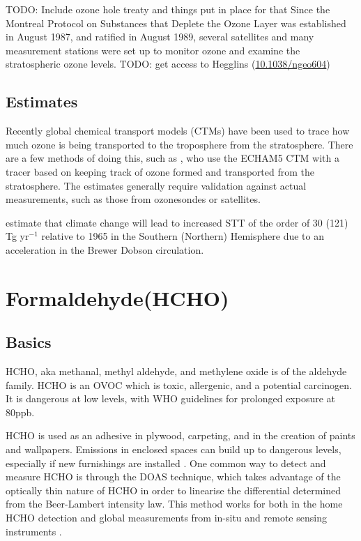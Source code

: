     TODO: Include ozone hole treaty and things put in place for that
    Since the Montreal Protocol on Substances that Deplete the Ozone Layer was established in August 1987, and ratified in August 1989, several satellites and many measurement stations were set up to monitor ozone and examine the stratospheric ozone levels.
    TODO: get access to Hegglins (\url{10.1038/ngeo604})
  \subsection{Estimates}
    
    Recently global chemical transport models (CTMs) have been used to trace how much ozone is being transported to the troposphere from the stratosphere.
    There are a few methods of doing this, such as \citet{Ojha2016}, who use the ECHAM5 CTM with a tracer based on keeping track of ozone formed and transported from the stratosphere.
    The estimates generally require validation against actual measurements, such as those from ozonesondes or satellites.
    
  \citet{Hegglin2009} estimate that climate change will lead to increased STT of the order of 30 (121) Tg yr$^{-1}$ relative to 1965 in the Southern (Northern) Hemisphere due to an acceleration in the Brewer Dobson circulation.
\section{Formaldehyde(HCHO)}
\label{ch_LitRev:sec:HCHO}
  
  \subsection{Basics}
    HCHO, aka methanal, methyl aldehyde, and methylene oxide is of the aldehyde family.
    HCHO is an OVOC which is toxic, allergenic, and a potential carcinogen. 
    It is dangerous at low levels, with WHO guidelines for prolonged exposure at 80ppb.
    
    HCHO is used as an adhesive in plywood, carpeting, and in the creation of paints and wallpapers.
    Emissions in enclosed spaces can build up to dangerous levels, especially if new furnishings are installed \citep{Davenport2015}.
    One common way to detect and measure HCHO is through the DOAS technique, which takes advantage of the optically thin nature of HCHO in order to linearise the differential determined from the Beer-Lambert intensity law.
    This method works for both in the home HCHO detection and global measurements from in-situ and remote sensing instruments \citep{Guenther1995, Abad2015, Davenport2015}.
    
